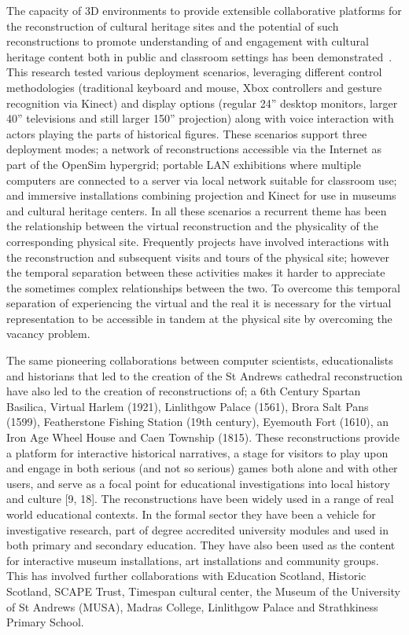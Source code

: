 The capacity of 3D environments to provide extensible collaborative platforms for the reconstruction of cultural heritage sites and the potential of such reconstructions to promote understanding of and engagement with cultural heritage content both in public and classroom settings has been demonstrated~\cite{Allison2012,Kennedy2012}. This research tested various deployment scenarios, leveraging different control methodologies (traditional keyboard and mouse, Xbox controllers and gesture recognition via Kinect) and display options (regular 24'' desktop monitors, larger 40'' televisions and still larger 150'' projection) along with voice interaction with actors playing the parts of historical figures. These scenarios support three deployment modes; a network of reconstructions accessible via the Internet as part of the OpenSim hypergrid; portable LAN exhibitions where multiple computers are connected to a server via local network suitable for classroom use; and immersive installations combining projection and Kinect for use in museums and cultural heritage centers. In all these scenarios a recurrent theme has been the relationship between the virtual reconstruction and the physicality of the corresponding physical site. Frequently projects have involved interactions with the reconstruction and subsequent visits and tours of the physical site; however the temporal separation between these activities makes it harder to appreciate the sometimes complex relationships between the two. To overcome this temporal separation of experiencing the virtual and the real it is necessary for the virtual representation to be accessible in tandem at the physical site by overcoming the vacancy problem.

The same pioneering collaborations between computer scientists, educationalists and historians that led to the creation of the St Andrews cathedral reconstruction have also led to the creation of reconstructions of; a 6th Century Spartan Basilica, Virtual Harlem (1921), Linlithgow Palace (1561), Brora Salt Pans (1599), Featherstone Fishing Station (19th century), Eyemouth Fort (1610), an Iron Age Wheel House and Caen Township (1815). These reconstructions provide a platform for interactive historical narratives, a stage for visitors to play upon and engage in both serious (and not so serious) games both alone and with other users, and serve as a focal point for educational investigations into local history and culture [9, 18]. The reconstructions have been widely used in a range of real world educational contexts. In the formal sector they have been a vehicle for investigative research, part of degree accredited university modules and used in both primary and secondary education. They have also been used as the content for interactive museum installations, art installations and community groups. This has involved further collaborations with Education Scotland, Historic Scotland, SCAPE Trust, Timespan cultural center, the Museum of the University of St Andrews (MUSA), Madras College, Linlithgow Palace and Strathkiness Primary School.


